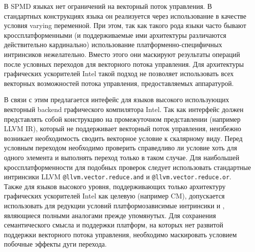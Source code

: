 В SPMD языках нет ограничений на векторный поток управления. В стандартных конструкциях языка он реализуется через использование в качестве условия varying переменной. При этом, так как такого рода языки часто бывают кроссплатформенными (и поддерживаемые ими архитектуры различаются действительно кардинально) использование платформенно-специфичных интринсиков нежелательно. Вместо этого они маскируют результаты операций после условных переходов для векторного потока управления. Для архитектуры графических ускорителей Intel такой подход не позволяет использовать всех векторных возможностей потока управления, предоставляемых аппаратурой.

В связи с этим предлагается интефейс для языков высокого использующих векторный backend графического компилятора Intel. Так как интерфейс должен представлять собой конструкцию на промежуточном представлении (например LLVM IR), который не поддерживает векторный поток управления, неизбежно возникает необходимость сводить векторное условие к скалярному виду. Перед условным переходом необходимо проверить справедливо ли условие хоть для одного элемента и выполнять переход только в таком случае. Для наибольшей кроссплатформенности для подобных проверок следует использовать стандартные интринсики LLVM \texttt{@llvm.vector.reduce.and} и \texttt{@llvm.vector.reduce.or}. Также для языков высокого уровня, поддерживающих только архитектуру графических ускорителей Intel как целевую (например CM), допускается использовать для редукции условий платформозависимые интринсики  и , являющиеся полными аналогами прежде упомянутых. Для сохранения семантического смысла и поддержки платформ, на которых нет развитой поддержки векторного потока управления, необходимо маскировать условием побочные эффекты дуги перехода.

